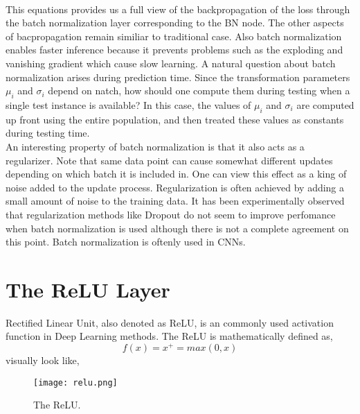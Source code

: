 \documentclass[11pt]{article}
\begin{document}
\\
This equations provides us a full view of the backpropagation of the loss through the batch normalization layer corresponding to the BN node. The other aspects of bacpropagation remain similiar to traditional case. Also batch normalization enables faster inference because it prevents problems such as the exploding and vanishing gradient which cause slow learning. A natural question about batch normalization arises during prediction time. Since the transformation parameters $\mu_i$ and $\sigma_i$ depend on natch, how should one compute them during testing when a single test instance is available? In this case, the values of $\mu_i$ and $\sigma_i$ are computed up front using the entire population, and then treated these values as constants during testing time. \\
An interesting property of batch normalization is that it also acts as a regularizer. Note that same data point can cause somewhat different updates depending on which batch it is included in. One can view this effect as a king of noise added to the update process. Regularization is often achieved by adding a small amount of noise to the training data. It has been experimentally observed that regularization methods like Dropout do not seem to improve perfomance when batch normalization is used although there is not a complete agreement on this point. Batch normalization is oftenly used in CNNs. 

\section{The ReLU Layer}
\hspace*{1cm} Rectified Linear Unit, also denoted as ReLU, is an commonly used activation function in Deep Learning methods. The ReLU is mathematically defined as, $$f(x) = x^+ = max(0,x)$$
visually look like,
\begin{figure}[H]
\centering
\texttt{[image: relu.png]}
\caption{The ReLU.}
\label{fig:figure3}
\end{figure}
\pagebreak
\end{document}
